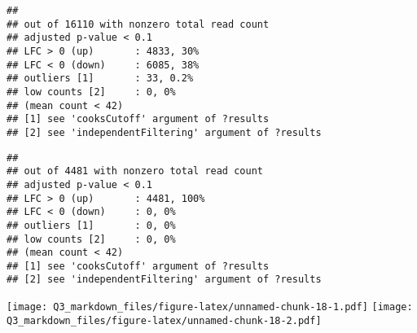 \documentclass[
]{article}
\begin{document}
\begin{verbatim}
## 
## out of 16110 with nonzero total read count
## adjusted p-value < 0.1
## LFC > 0 (up)       : 4833, 30%
## LFC < 0 (down)     : 6085, 38%
## outliers [1]       : 33, 0.2%
## low counts [2]     : 0, 0%
## (mean count < 42)
## [1] see 'cooksCutoff' argument of ?results
## [2] see 'independentFiltering' argument of ?results
\end{verbatim}

\begin{verbatim}
## 
## out of 4481 with nonzero total read count
## adjusted p-value < 0.1
## LFC > 0 (up)       : 4481, 100%
## LFC < 0 (down)     : 0, 0%
## outliers [1]       : 0, 0%
## low counts [2]     : 0, 0%
## (mean count < 42)
## [1] see 'cooksCutoff' argument of ?results
## [2] see 'independentFiltering' argument of ?results
\end{verbatim}

\texttt{[image: Q3\_markdown\_files/figure-latex/unnamed-chunk-18-1.pdf]}
\texttt{[image: Q3\_markdown\_files/figure-latex/unnamed-chunk-18-2.pdf]}
\end{document}
